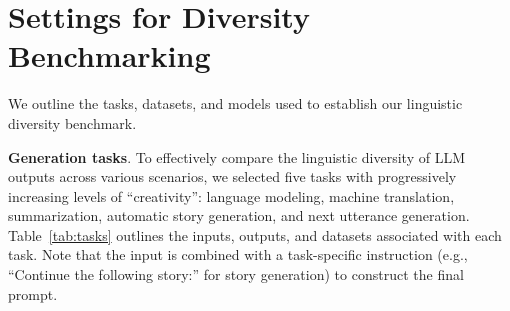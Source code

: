 \documentclass[11pt,a4paper]{article}
\begin{document}
\section{Settings for Diversity Benchmarking}
We outline the tasks, datasets, and models used to establish our linguistic diversity benchmark.

\smallskip

\noindent\textbf{Generation tasks}.
To effectively compare the linguistic diversity of LLM outputs across various scenarios, we selected five tasks with progressively increasing levels of ``creativity'': language modeling, machine translation, summarization, automatic story generation, and next utterance generation. Table~\ref{tab:tasks} outlines the inputs, outputs, and datasets associated with each task. Note that the input is combined with a task-specific instruction (e.g., ``Continue the following story:'' for story generation) to construct the final prompt.






\end{document}
